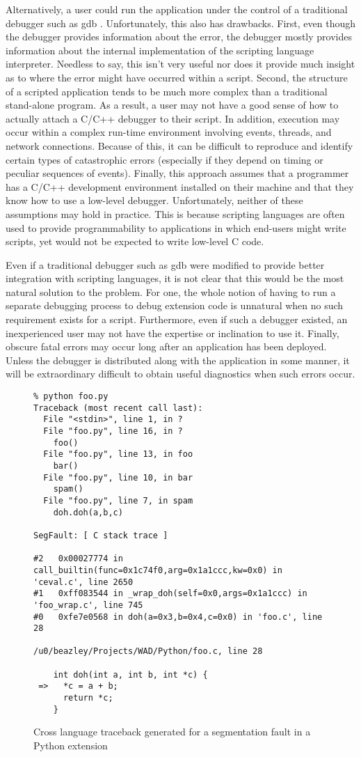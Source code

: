 Alternatively, a user could run the application under the control of a
traditional debugger such as gdb \cite{gdb}. Unfortunately, this also has
drawbacks.  First, even though the debugger provides information about the error,
the debugger mostly provides information about the internal
implementation of the scripting language interpreter.  Needless
to say, this isn't very useful nor does it provide much insight as to
where the error might have occurred within a script.  Second, 
the structure of a scripted application tends to be much more complex
than a traditional stand-alone program.  As a result, a user may not
have a good sense of how to actually attach a C/C++ debugger to their
script.  In addition, execution may occur within a
complex run-time environment involving events, threads, and network
connections.  Because of this, it can be difficult to reproduce
and identify certain types of catastrophic errors (especially if they
depend on timing or peculiar sequences of events). Finally, this approach
assumes that a programmer has a C/C++ development environment installed on
their machine and that they know how to use a low-level
debugger.  Unfortunately, neither of these assumptions may hold in practice.
This is because scripting languages are often used to provide programmability to
applications in which end-users might write scripts, yet would not be expected
to write low-level C code.

Even if a traditional debugger such as gdb were modified to
provide better integration with scripting languages, it is not clear
that this would be the most natural solution to the problem.
For one, the whole notion of having to run a separate debugging process to debug
extension code is unnatural when no such requirement exists for
a script.  Furthermore, even if such a debugger existed, an inexperienced user may not
have the expertise or inclination to use it.  Finally, 
obscure fatal errors may occur long after an application has been deployed. 
Unless the debugger is distributed along with the application in some manner, it will be
extraordinary difficult to obtain useful diagnostics when such errors occur.

\begin{figure*}[t]
{\small
\begin{verbatim}
% python foo.py
Traceback (most recent call last):
  File "<stdin>", line 1, in ?
  File "foo.py", line 16, in ?
    foo()
  File "foo.py", line 13, in foo
    bar()
  File "foo.py", line 10, in bar
    spam()
  File "foo.py", line 7, in spam
    doh.doh(a,b,c)

SegFault: [ C stack trace ]

#2   0x00027774 in call_builtin(func=0x1c74f0,arg=0x1a1ccc,kw=0x0) in 'ceval.c', line 2650
#1   0xff083544 in _wrap_doh(self=0x0,args=0x1a1ccc) in 'foo_wrap.c', line 745
#0   0xfe7e0568 in doh(a=0x3,b=0x4,c=0x0) in 'foo.c', line 28

/u0/beazley/Projects/WAD/Python/foo.c, line 28

    int doh(int a, int b, int *c) {
 =>   *c = a + b;
      return *c;
    }
\end{verbatim}
}
\caption{Cross language traceback generated for a segmentation fault in a Python extension}
\end{figure*}


